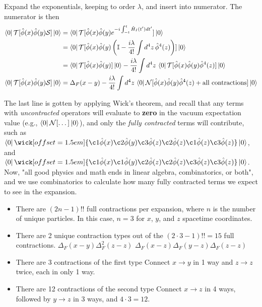 \noindent Expand the exponentials, keeping to order $\lambda$, and insert into numerator. The numerator is then
\begin{align}
\bra{0} \mathcal{T} [\hat{\phi}(x) \hat{\phi}(y) \mathcal{S}]\ket{0} &= \bra{0} \mathcal{T} [\hat{\phi}(x) \hat{\phi}(y) e^{-i\int^t_{-t} \hat{H}_I(t')dt'}]\ket{0} \\
&= \bra{0} \mathcal{T} [\hat{\phi}(x) \hat{\phi}(y) \left( \mathbb{I} - \frac{i\lambda}{4!} \int d^4 z \, \hat{\phi}^4(z) \right)]\ket{0} \\
&= \bra{0} \mathcal{T} [\hat{\phi}(x) \hat{\phi}(y)] \ket{0} - \frac{i\lambda}{4!} \int d^4 z \, \bra{0} \mathcal{T} [\hat{\phi}(x) \hat{\phi}(y) \hat{\phi}^4(z)] \ket{0} \\
\bra{0} \mathcal{T} [\hat{\phi}(x) \hat{\phi}(y) \mathcal{S}]\ket{0} &= \Delta_F(x-y) - \frac{i\lambda}{4!} \int d^4 z \, \bra{0} \mathcal{N} [\hat{\phi}(x) \hat{\phi}(y) \hat{\phi}^4(z) + \text{all contractions}] \ket{0}
\end{align}

\noindent The last line is gotten by applying Wick's theorem, and recall that any terms with \textit{uncontracted} operators will evaluate to \textbf{zero} in the vacuum expectation value (e.g., $\bra{0}\mathcal{N}[\dots]\ket{0}$), and only the \textit{fully contracted} terms will contribute, such as $\bra{0}\wick[offset=1.5em]{\c1 {\hat{\phi}(x)} \c2 {\hat{\phi}(y)} \c3 {\hat{\phi}(z)} \c2 {\hat{\phi}(z)} \c1 {\hat{\phi}(z)} \c3 {\hat{\phi}(z)}}\ket{0}$, and $\bra{0}\wick[offset=1.5em]{\c1 {\hat{\phi}(x)} \c1 {\hat{\phi}(y)} \c2 {\hat{\phi}(z)} \c2 {\hat{\phi}(z)} \c3 {\hat{\phi}(z)} \c3 {\hat{\phi}(z)}}\ket{0}$. \\

\noindent Now, "all good physics and math ends in linear algebra, combinatorics, or both", and we use combinatorics to calculate how many fully contracted terms we expect to see in the expansion. 
\begin{itemize}
\item There are $(2n-1)!!$ full contractions per expansion, where $n$ is the number of unique particles. In this case, $n=3$ for $x$, $y$, and $z$ spacetime coordinates.
\item There are 2 unique contraction types out of the $(2\cdot3-1)!! = 15$ full contractions.
	\subitem $\Delta_F(x-y) \Delta_F^2(z-z)$
	\subitem $\Delta_F(x-z) \Delta_F(y-z) \Delta_F(z-z)$
\item There are 3 contractions of the first type
	\subitem Connect $x\to y$ in 1 way and $z\to z$ twice, each in only 1 way.
\item There are 12 contractions of the second type
	\subitem Connect $x\to z$ in 4 ways, followed by $y\to z$ in 3 ways, and $4\cdot 3=12$.
\end{itemize}

